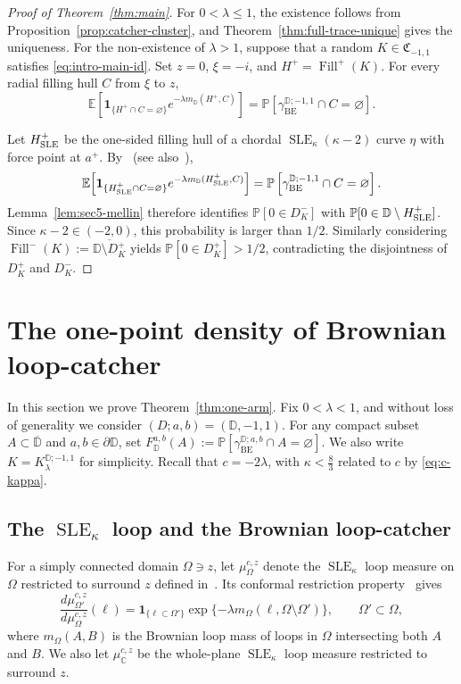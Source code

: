 \documentclass[11pt]{article}
\numberwithin{equation}{section}
\newcommand{\D}{\mathbb{D}}
\newcommand{\C}{\mathbb{C}}
\newcommand{\E}{\mathbb{E}}
\newcommand{\1}{\mathbf{1}}
\newcommand{\BE}{\mathrm{BE}}
\DeclareMathOperator{\SLE}{SLE}
\newcommand\ol[1]{\overline{#1}}
\newcommand{\one}{\mathbf 1}
\newcommand{\Prob}{\mathbb P}
\begin{document}
\begin{proof}[Proof of Theorem~\ref{thm:main}]
For $0<\lambda\le 1$, the existence follows from Proposition~\ref{prop:catcher-cluster}, and Theorem~\ref{thm:full-trace-unique} gives the uniqueness. For the non-existence of $\lambda>1$, suppose that a random \(K\in\mathfrak C_{-1,1}\) satisfies
\eqref{eq:intro-main-id}.  Set \(z=0\), \(\xi=-i\), and
\(H^+=\operatorname{Fill}^+(K)\).  For every radial filling hull \(C\) from
\(\xi\) to \(z\),
\[
\E\!\left[
 \one_{\{H^+\cap C=\varnothing\}}e^{-\lambda m_\D(H^+,C)}\right]
=\Prob\left[\gamma_{\BE}^{\D;-1,1}\cap C=\varnothing\right].
\]

Let \(H_{\rm SLE}^+\) be the one-sided filling hull of a chordal
\(\SLE_\kappa(\kappa-2)\) curve \(\eta\) with force point at \(a^+\). By~\cite{dubedat-rho} (see also~\cite[Proposition 6.2]{qian2021generalized}), \[
\E\!\left[
 \one_{\{H_{\rm SLE}^+\cap C=\varnothing\}}
 e^{-\lambda m_\D(H_{\rm SLE}^+,C)}\right]=\Prob\left[\gamma_{\BE}^{\D;-1,1}\cap C=\varnothing\right].
\]
Lemma~\ref{lem:sec5-mellin}
therefore identifies
\(\Prob[0\in D_K^-]\) with
\(\Prob[0\in\D\setminus H_{\rm SLE}^+]\). Since
\(\kappa-2\in(-2,0)\), this probability is larger than \(1/2\).  Similarly considering $\operatorname{Fill}^{-}(K):=\ol{\D\setminus D_K^+}$ yields \(\Prob[0\in D_K^+]>1/2\), contradicting the disjointness of
\(D_K^+\) and \(D_K^-\).
\end{proof}


\section{The one-point density of Brownian loop-catcher}\label{sec:one-arm}

In this section we prove Theorem~\ref{thm:one-arm}. Fix $0<\lambda<1$, and without loss of generality we consider $(D;a,b)=(\D,-1,1)$. For any compact subset $A\subset\ol\D$ and $a,b\in\partial\D$, set $F_\D^{a,b}(A):=\Prob\left[\gamma_{\BE}^{\D;a,b}\cap A=\varnothing\right]$. We also write \(K=K_\lambda^{\D;-1,1}\) for simplicity. Recall that \(c=-2\lambda\), with \(\kappa<\frac{8}{3}\) related to \(c\) by \eqref{eq:c-kappa}. 




\subsection{The \(\SLE_\kappa\) loop and the Brownian loop-catcher}

For a simply connected domain \(\Omega\ni z\), let \(\mu_\Omega^{c,z}\) denote the $\SLE_\kappa$ loop
measure on \(\Omega\) restricted to surround \(z\) defined in~\cite{Zhan2021}.  Its
conformal restriction property~\cite[Theorem 5.1]{Zhan2021} gives
\begin{equation}\label{eq:one-arm-MKS-restriction}
 \frac{d\mu_{\Omega'}^{c,z}}{d\mu_\Omega^{c,z}}(\ell)
 =\one_{\{\ell\subset {\Omega'}\}}
   \exp\{-\lambda m_\Omega(\ell,\Omega\setminus {\Omega'})\},
 \qquad {\Omega'}\subset \Omega,
\end{equation}
where \(m_\Omega(A,B)\) is the Brownian loop mass of loops in \(\Omega\)
intersecting both \(A\) and \(B\). We also let $\mu_\C^{c,z}$ be the whole-plane $\SLE_\kappa$ loop measure restricted to surround $z$.
\end{document}
